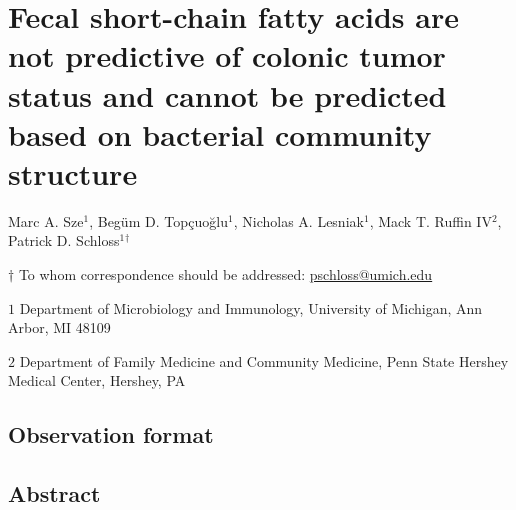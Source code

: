 \documentclass[11pt,]{article}
\title{}
\author{}
\date{}
\begin{document}
\vspace{35mm}

\hypertarget{fecal-short-chain-fatty-acids-are-not-predictive-of-colonic-tumor-status-and-cannot-be-predicted-based-on-bacterial-community-structure}{%
\section{Fecal short-chain fatty acids are not predictive of colonic
tumor status and cannot be predicted based on bacterial community
structure}\label{fecal-short-chain-fatty-acids-are-not-predictive-of-colonic-tumor-status-and-cannot-be-predicted-based-on-bacterial-community-structure}}

\vspace{35mm}

Marc A. Sze\({^1}\), Begüm D. Topçuoğlu\({^1}\), Nicholas A.
Lesniak\({^1}\), Mack T. Ruffin IV\({^2}\), Patrick D.
Schloss\({^1}\)\({^\dagger}\)

\vspace{40mm}

\(\dagger\) To whom correspondence should be addressed:
\href{mailto:pschloss@umich.edu}{pschloss@umich.edu}

\(1\) Department of Microbiology and Immunology, University of Michigan,
Ann Arbor, MI 48109

\(2\) Department of Family Medicine and Community Medicine, Penn State
Hershey Medical Center, Hershey, PA

\vspace{10mm}

\hypertarget{observation-format}{%
\subsection{Observation format}\label{observation-format}}

\newpage
\linenumbers

\hypertarget{abstract}{%
\subsection{Abstract}\label{abstract}}
\end{document}
